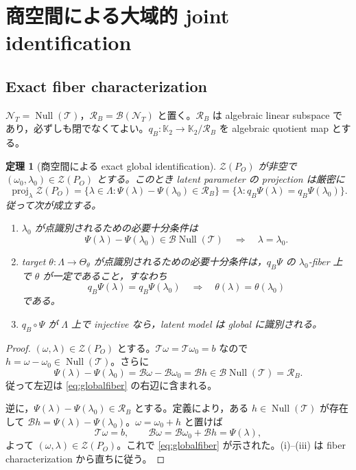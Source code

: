 \documentclass[11pt,a4paper]{ltjsarticle}
\newtheorem{theorem}{定理}[section]
\theoremstyle{remark}
\newcommand{\cN}{\mathcal N}
\newcommand{\cR}{\mathcal R}
\newcommand{\cZ}{\mathcal Z}
\newcommand{\Top}{\mathscr T}
\newcommand{\Bop}{\mathscr B}
\newcommand{\Null}{\operatorname{Null}}
\begin{document}
\section{商空間による大域的 joint identification}\label{sec:global}

\subsection{Exact fiber characterization}
$\cN_T=\Null(\Top)$，$\cR_B=\Bop(\cN_T)$ と置く。$\cR_B$ は algebraic linear subspace であり，必ずしも閉でなくてよい。$q_B:\mathbb K_2\to\mathbb K_2/\cR_B$ を algebraic quotient map とする。

\begin{theorem}[商空間による exact global identification]\label{thm:quotient}
$\cZ(P_O)$ が非空で $(\omega_0,\lambda_0)\in\cZ(P_O)$ とする。このとき latent parameter の projection は厳密に
\begin{equation}
\operatorname{proj}_\lambda\cZ(P_O)
=\{\lambda\in\Lambda:
\Psi(\lambda)-\Psi(\lambda_0)\in\cR_B\}
=\{\lambda:q_B\Psi(\lambda)=q_B\Psi(\lambda_0)\}.
\label{eq:globalfiber}
\end{equation}
従って次が成立する。
\begin{enumerate}[label=(\roman*)]
\item $\lambda_0$ が点識別されるための必要十分条件は
\begin{equation}
\Psi(\lambda)-\Psi(\lambda_0)\in\Bop\Null(\Top)
\quad\Longrightarrow\quad \lambda=\lambda_0.
\label{eq:globalidcond}
\end{equation}
\item target $\theta:\Lambda\to\Theta_\theta$ が点識別されるための必要十分条件は，$q_B\Psi$ の $\lambda_0$-fiber 上で $\theta$ が一定であること，すなわち
\begin{equation}
q_B\Psi(\lambda)=q_B\Psi(\lambda_0)
\quad\Longrightarrow\quad
\theta(\lambda)=\theta(\lambda_0)
\label{eq:globaltarget}
\end{equation}
である。
\item $q_B\circ\Psi$ が $\Lambda$ 上で injective なら，latent model は global に識別される。
\end{enumerate}
\end{theorem}

\begin{proof}
$(\omega,\lambda)\in\cZ(P_O)$ とする。$\Top\omega=\Top\omega_0=b$ なので $h=\omega-\omega_0\in\Null(\Top)$。さらに
\[
\Psi(\lambda)-\Psi(\lambda_0)
=\Bop\omega-\Bop\omega_0
=\Bop h\in\Bop\Null(\Top)=\cR_B.
\]
従って左辺は \eqref{eq:globalfiber} の右辺に含まれる。

逆に，$\Psi(\lambda)-\Psi(\lambda_0)\in\cR_B$ とする。定義により，ある $h\in\Null(\Top)$ が存在して
$\Bop h=\Psi(\lambda)-\Psi(\lambda_0)$。$\omega=\omega_0+h$ と置けば
\[
\Top\omega=b,
\qquad
\Bop\omega=\Bop\omega_0+\Bop h=\Psi(\lambda),
\]
よって $(\omega,\lambda)\in\cZ(P_O)$。これで \eqref{eq:globalfiber} が示された。(i)--(iii) は fiber characterization から直ちに従う。
\end{proof}
\end{document}
